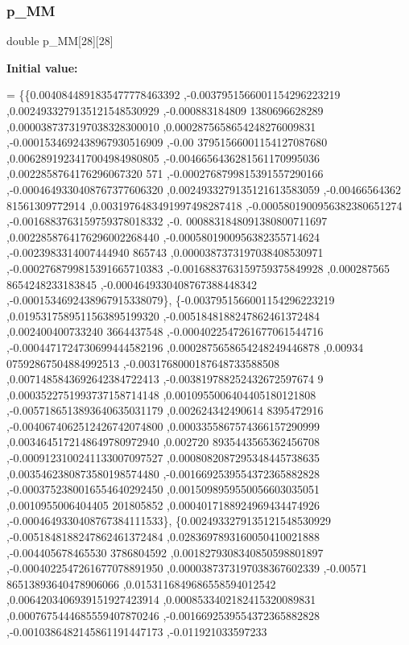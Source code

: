 \subsubsection{\texorpdfstring{p\+\_\+\+MM}{p\_MM}}
{\footnotesize\ttfamily double p\+\_\+\+MM\mbox{[}28\mbox{]}\mbox{[}28\mbox{]}}

{\bfseries Initial value\+:}
\begin{DoxyCode}
= \{\{0.0040844891835477778463392 ,-0.0037951566001154296223219 ,0.0024933279135121548530929 ,-0.000883184809
      1380696628289 ,0.0000387373197038328300010 ,0.0002875658654248276009831 ,-0.0001534692438967930516909 ,-0.00
      37951566001154127087680 ,0.0062891923417004984980805 ,-0.0046656436281561170995036 ,0.0022858764176296067320
      571 ,-0.0002768799815391557290166 ,-0.0004649330408767377606320 ,0.0024933279135121613583059 ,-0.00466564362
      81561309772914 ,0.0031976483491997498287418 ,-0.0005801900956382380651274 ,-0.0016883763159759378018332 ,-0.
      0008831848091380800711697 ,0.0022858764176296002268440 ,-0.0005801900956382355714624 ,-0.0023983314007444940
      865743 ,0.0000387373197038408530971 ,-0.0002768799815391665710383 ,-0.0016883763159759375849928 ,0.000287565
      8654248233183845 ,-0.0004649330408767388448342 ,-0.0001534692438967915338079\},
\{-0.0037951566001154296223219 ,0.0195317589511563895199320 ,-0.0051848188247862461372484 ,0.002400400733240
      3664437548 ,-0.0004022547261677061544716 ,-0.0004471724730699444582196 ,0.0002875658654248249446878 ,0.00934
      07592867504884992513 ,-0.0031768000187648733588508 ,0.0071485843692642384722413 ,-0.003819788252432672597674
      9 ,0.0003522751993737158714148 ,0.0010955006404405180121808 ,-0.0057186513893640635031179 ,0.002624342490614
      8395472916 ,-0.0040674062512426742074800 ,0.0003355867574366157290999 ,0.0034645172148649780972940 ,0.002720
      8935443565362456708 ,-0.0009123100241133007097527 ,0.0008082087295348445738635 ,0.0035462380873580198574480 
      ,-0.0016692539554372365882828 ,-0.0003752380016554640292450 ,0.0015098959550056603035051 ,0.0010955006404405
      201805852 ,0.0004017188924969434474926 ,-0.0004649330408767384111533\},
\{0.0024933279135121548530929 ,-0.0051848188247862461372484 ,0.0283697893160050410021888 ,-0.004405678465530
      3786804592 ,0.0018279308340850598801897 ,-0.0004022547261677078891950 ,0.0000387373197038367602339 ,-0.00571
      86513893640478906066 ,0.0153116849686558594012542 ,0.0064203406939151927423914 ,0.0008533402182415320089831 
      ,0.0007675444685559407870246 ,-0.0016692539554372365882828 ,-0.0010386482145861191447173 ,-0.011921033597233

\end{DoxyCode}
